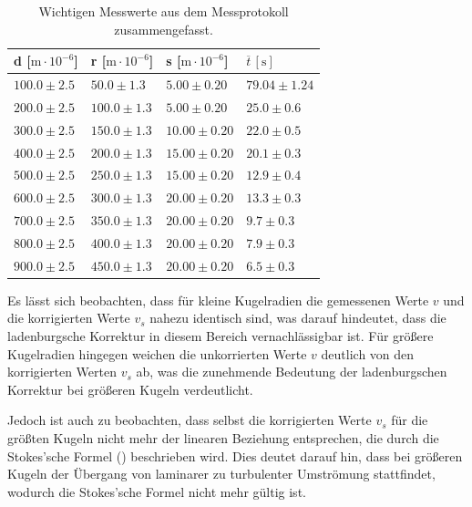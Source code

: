\begin{table}[h]
\caption{Wichtigen Messwerte aus dem Messprotokoll zusammengefasst.}
\label{tab:messwerteTab}
\centering
\begin{tabular}{llll}
\toprule
d [$\mathrm{m} \cdot 10^{-6}$] & r [$\mathrm{m} \cdot 10^{-6}$] & s [$\mathrm{m} \cdot 10^{-6}$] & $\overline{t} \, [\mathrm{s}]$ \\
\midrule
$100.0 \pm 2.5$ & $50.0 \pm 1.3$ & $5.00 \pm 0.20$ & $79.04 \pm 1.24$ \\
$200.0 \pm 2.5$ & $100.0 \pm 1.3$ & $5.00 \pm 0.20$ & $25.0 \pm 0.6$ \\
$300.0 \pm 2.5$ & $150.0 \pm 1.3$ & $10.00 \pm 0.20$ & $22.0 \pm 0.5$ \\
$400.0 \pm 2.5$ & $200.0 \pm 1.3$ & $15.00 \pm 0.20$ & $20.1 \pm 0.3$ \\
$500.0 \pm 2.5$ & $250.0 \pm 1.3$ & $15.00 \pm 0.20$ & $12.9 \pm 0.4$ \\
$600.0 \pm 2.5$ & $300.0 \pm 1.3$ & $20.00 \pm 0.20$ & $13.3 \pm 0.3$ \\
$700.0 \pm 2.5$ & $350.0 \pm 1.3$ & $20.00 \pm 0.20$ & $9.7 \pm 0.3$ \\
$800.0 \pm 2.5$ & $400.0 \pm 1.3$ & $20.00 \pm 0.20$ & $7.9 \pm 0.3$ \\
$900.0 \pm 2.5$ & $450.0 \pm 1.3$ & $20.00 \pm 0.20$ & $6.5 \pm 0.3$ \\
\bottomrule
\end{tabular}
\end{table}



Es lässt sich beobachten, dass für kleine Kugelradien  die gemessenen Werte \(v\) und die korrigierten Werte \(v_s\) nahezu identisch sind, was darauf hindeutet, dass die ladenburgsche Korrektur in diesem Bereich vernachlässigbar ist. Für größere Kugelradien hingegen weichen die unkorrierten Werte \(v\) deutlich von den korrigierten Werten \(v_s\) ab, was die zunehmende Bedeutung der ladenburgschen Korrektur bei größeren Kugeln verdeutlicht. 

Jedoch ist auch zu beobachten, dass selbst die korrigierten Werte \(v_s\) für die größten Kugeln nicht mehr der linearen Beziehung entsprechen, die durch die Stokes'sche Formel () beschrieben wird. Dies deutet darauf hin, dass bei größeren Kugeln der Übergang von laminarer zu turbulenter Umströmung stattfindet, wodurch die Stokes'sche Formel nicht mehr gültig ist.

